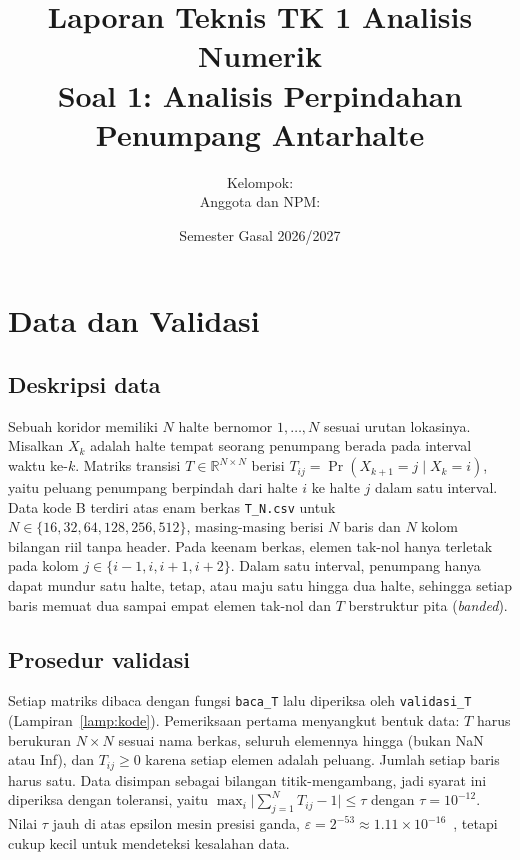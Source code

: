 \documentclass[12pt,a4paper]{article}
\title{Laporan Teknis TK 1 Analisis Numerik\\[3pt]
\large Soal 1: Analisis Perpindahan Penumpang Antarhalte}
\author{Kelompok: \underline{\hspace{4cm}}\\[5pt]
Anggota dan NPM: \underline{\hspace{8cm}}}
\date{Semester Gasal 2026/2027}
\newcommand{\R}{\mathbb{R}}
\numberwithin{equation}{section}
\begin{document}
\maketitle

\setcounter{section}{1}

\section{Data dan Validasi}\label{sec:data}

\subsection{Deskripsi data}
Sebuah koridor memiliki $N$ halte bernomor $1,\dots,N$ sesuai urutan lokasinya. Misalkan $X_k$ adalah halte tempat
seorang penumpang berada pada interval waktu ke-$k$. Matriks transisi $T\in\R^{N\times N}$ berisi
$T_{ij}=\Pr(X_{k+1}=j\mid X_k=i)$, yaitu peluang penumpang berpindah dari halte $i$ ke halte $j$ dalam satu interval.
Data kode B terdiri atas enam berkas \texttt{T\_N.csv} untuk $N\in\{16,32,64,128,256,512\}$, masing-masing berisi
$N$ baris dan $N$ kolom bilangan riil tanpa header. Pada keenam berkas, elemen tak-nol hanya terletak pada kolom
$j\in\{i-1,i,i+1,i+2\}$. Dalam satu interval, penumpang hanya dapat mundur satu halte, tetap, atau maju satu hingga dua
halte, sehingga setiap baris memuat dua sampai empat elemen tak-nol dan $T$ berstruktur pita (\emph{banded}).

\subsection{Prosedur validasi}
Setiap matriks dibaca dengan fungsi \texttt{baca\_T} lalu diperiksa oleh \texttt{validasi\_T}
(Lampiran~\ref{lamp:kode}). Pemeriksaan pertama menyangkut bentuk data: $T$ harus berukuran $N\times N$ sesuai nama
berkas, seluruh elemennya hingga (bukan NaN atau Inf), dan $T_{ij}\ge0$ karena setiap elemen adalah peluang.
Jumlah setiap baris harus satu. Data disimpan sebagai bilangan titik-mengambang, jadi syarat ini diperiksa dengan
toleransi, yaitu $\max_i\bigl\lvert\sum_{j=1}^{N}T_{ij}-1\bigr\rvert\le\tau$ dengan $\tau=10^{-12}$. Nilai $\tau$
jauh di atas epsilon mesin presisi ganda, $\varepsilon=2^{-53}\approx1.11\times10^{-16}$~\cite{heath}, tetapi cukup
kecil untuk mendeteksi kesalahan data.
\end{document}
